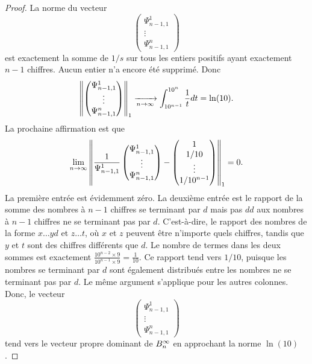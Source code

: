 \begin{proof}
	La norme du vecteur
	\[ 
	\begin{pmatrix}
		\Psi_{n-1,1}^1 \\
		\vdots \\
		\Psi_{n-1,1}^n 
	\end{pmatrix}
	\] 
	\normalsize
	est exactement la somme de $1/s$ sur tous les entiers positifs ayant
	exactement $n-1$ chiffres. Aucun entier n'a encore \'et\'e supprim\'e. Donc
	\[
		\left\lVert\begin{pmatrix}
			\Psi_{n-1,1}^1 \\
			\vdots \\
			\Psi_{n-1,1}^n 
		\end{pmatrix}\right\rVert_{1}
		\xrightarrow[n\rightarrow\infty]{} \int_{10^{n-1}}^{10^{n}}\frac{1}{t}dt = \ln(10).
	\]
	La prochaine affirmation est que
	\[
		\lim_{n\rightarrow\infty}\left\lVert
		\frac{1}{\Psi_{n-1,1}^{1}}\begin{pmatrix}
			\Psi_{n-1,1}^1 \\
			\vdots \\
			\Psi_{n-1,1}^n 
		\end{pmatrix} - \begin{pmatrix}
			1 \\
			1/10 \\
			\vdots\\
			1/10^{n-1}
		\end{pmatrix}\right\rVert_{1} = 0.
	\]
	La premi\`ere entr\'ee est \'evidemment z\'ero. La deuxi\`eme entr\'ee est
	le rapport de la somme des nombres \`a $n-1$ chiffres se terminant par $d$
	mais pas $dd$ aux nombres \`a $n-1$ chiffres ne se terminant pas par $d$.
	C'est-\`a-dire, le rapport des nombres de la forme $x\ldots yd$ et $z\ldots
	t$, o\`u $x$ et $z$ peuvent \^{e}tre n'importe quels chiffres, tandis que
	$y$ et $t$ sont des chiffres diff\'erents que $d$. Le nombre de termes dans
	les deux sommes est exactement $\frac{10^{n-2} \times 9}{10^{n-1} \times 9}
	= \frac{1}{10}$. Ce rapport tend vers $1/10$, puisque les nombres se
	terminant par $d$ sont \'egalement distribu\'es entre les nombres ne se
	terminant pas par $d$. Le m\^{e}me argument s'applique pour les autres
	colonnes. Donc, le vecteur
	\[
		\begin{pmatrix}
			\Psi_{n-1,1}^1 \\
			\vdots \\
			\Psi_{n-1,1}^n 
		\end{pmatrix}
	\]
	tend vers le vecteur propre dominant de $B_{n}^{\infty}$ en
	approchant la norme $\ln(10)$.
\end{proof}
